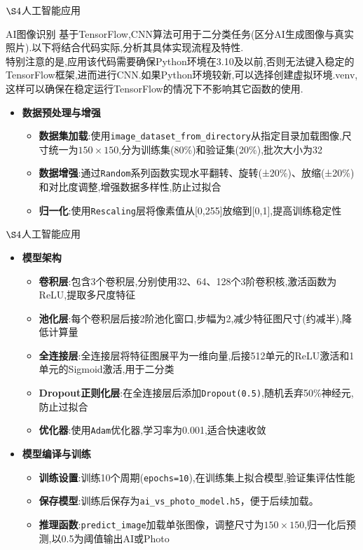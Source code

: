 \documentclass{beamer}
\begin{document}
\begin{frame}{$\S4$人工智能应用}
    \begin{block}{AI图像识别}
        基于TensorFlow,CNN算法可用于二分类任务(区分AI生成图像与真实照片).以下将结合代码实际,分析其具体实现流程及特性.
        \\特别注意的是,应用该代码需要确保Python环境在3.10及以前,否则无法键入稳定的TensorFlow框架,进而进行CNN.如果Python环境较新,可以选择创建虚拟环境.venv,这样可以确保在稳定运行TensorFlow的情况下不影响其它函数的使用.
    \end{block}
    \begin{itemize}
        \item \textbf{数据预处理与增强}
        \begin{itemize}
            \item \textbf{数据集加载}:使用\texttt{image\_dataset\_from\_directory}从指定目录加载图像,尺寸统一为\(150 \times 150\),分为训练集(80\%)和验证集(20\%),批次大小为32
            \item \textbf{数据增强}:通过\texttt{Random}系列函数实现水平翻转、旋转(±20\%)、放缩(±20\%)和对比度调整,增强数据多样性,防止过拟合
            \item \textbf{归一化}:使用\texttt{Rescaling}层将像素值从[0,255]放缩到[0,1],提高训练稳定性
        \end{itemize}
    \end{itemize}
\end{frame}

\begin{frame}{$\S4$人工智能应用}
    \begin{itemize}
    \item \textbf{模型架构}
        \begin{itemize}
            \item \textbf{卷积层}:包含3个卷积层,分别使用32、64、128个3阶卷积核,激活函数为ReLU,提取多尺度特征
            \item \textbf{池化层}:每个卷积层后接2阶池化窗口,步幅为2,减少特征图尺寸(约减半),降低计算量
            \item \textbf{全连接层}:全连接层将特征图展平为一维向量,后接512单元的ReLU激活和1单元的Sigmoid激活,用于二分类
            \item \textbf{Dropout正则化层}:在全连接层后添加\texttt{Dropout(0.5)},随机丢弃50\%神经元,防止过拟合
            \item \textbf{优化器}:使用\texttt{Adam}优化器,学习率为0.001,适合快速收敛
        \end{itemize}
        \item \textbf{模型编译与训练}
        \begin{itemize}
            \item \textbf{训练设置}:训练10个周期(\texttt{epochs=10}),在训练集上拟合模型,验证集评估性能
            \item \textbf{保存模型}:训练后保存为\texttt{ai\_vs\_photo\_model.h5}，便于后续加载。
            \item \textbf{推理函数}:\texttt{predict\_image}加载单张图像，调整尺寸为\(150 \times 150\),归一化后预测,以0.5为阈值输出AI或Photo
        \end{itemize}
    \end{itemize}
\end{frame}
\end{document}
